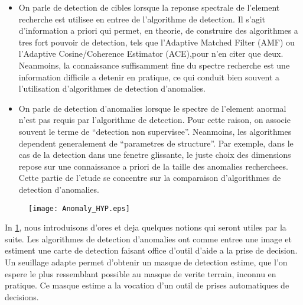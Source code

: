 \begin{itemize}
\item {On parle de detection de cibles lorsque la reponse
spectrale de l'element recherche est utilisee en entree de
l'algorithme de detection. Il s'agit d'information a priori qui
permet, en theorie, de construire des algorithmes a tres fort pouvoir
de detection, tels que l'Adaptive Matched Filter (AMF) ou l'Adaptive
Cosine/Coherence Estimator (ACE),pour n'en citer que deux. Neanmoins,
la connaissance suffisamment fine du spectre recherche est une
information difficile a detenir en pratique, ce qui conduit bien
souvent a l'utilisation d'algorithmes de detection d'anomalies.}
\item {On parle de detection d'anomalies lorsque le spectre de
  l'element anormal n'est pas requis par l'algorithme de
  detection. Pour cette raison, on associe souvent le terme de
  ``detection non supervisee''. Neanmoins, les algorithmes dependent
  generalement de ``parametres de structure''. Par exemple, dans le
  cas de la detection dans une fenetre glissante, le juste choix des
  dimensions repose sur une connaissance a priori de la taille des
  anomalies recherchees. Cette partie de l'etude se concentre sur la
  comparaison d'algorithmes de detection d'anomalies.}
\end{itemize}
    
\begin{figure}[h]
  \centering
  \texttt{[image: Anomaly\_HYP.eps]}
  \label{fig:anomaly_hyp}
\end{figure}
In \ref{fig:anomaly_hyp}, nous introduisons d'ores et deja quelques notions
qui seront utiles par la suite. Les algorithmes de detection
d'anomalies ont comme entree une image et estiment une carte de
detection faisant office d'outil d'aide a la prise de decision. Un
seuillage adapte permet d'obtenir un masque de detection estime, que
l'on espere le plus ressemblant possible au masque de verite terrain,
inconnu en pratique. Ce masque estime a la vocation d'un outil de
prises automatiques de decisions.

